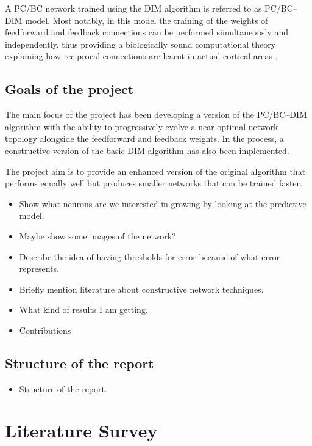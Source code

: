 \documentclass[11pt,a4paper]{report}
\begin{document}
		A PC/BC network trained using the DIM algorithm is referred to as PC/BC--DIM model. Most notably, in this model the training of the weights of feedforward and feedback connections can be performed simultaneously and independently, thus providing a biologically sound computational theory explaining how reciprocal connections are learnt in actual cortical areas \cite{callaway1998local}\cite{spratling2012unsupervised}.
		
		\section{Goals of the project}
		The main focus of the project has been developing a version of the PC/BC--DIM algorithm with the ability to progressively evolve a near-optimal network topology alongside the feedforward and feedback weights. In the process, a constructive version of the basic DIM algorithm has also been implemented.
		
		The project aim is to provide an enhanced version of the original algorithm that performs equally well but produces smaller networks that can be trained faster.
		
		
		
		\begin{itemize}
			\item Show what neurons are we interested in growing by looking at the predictive model.
			\item Maybe show some images of the network?
			\item Describe the idea of having thresholds for error because of what error represents.
			\item Briefly mention literature about constructive network techniques.
			\item What kind of results I am getting.
			\item Contributions
		\end{itemize}

		\section{Structure of the report}
		\begin{itemize}
			\item Structure of the report.
		\end{itemize}
	
	\chapter{Literature Survey}
\end{document}
